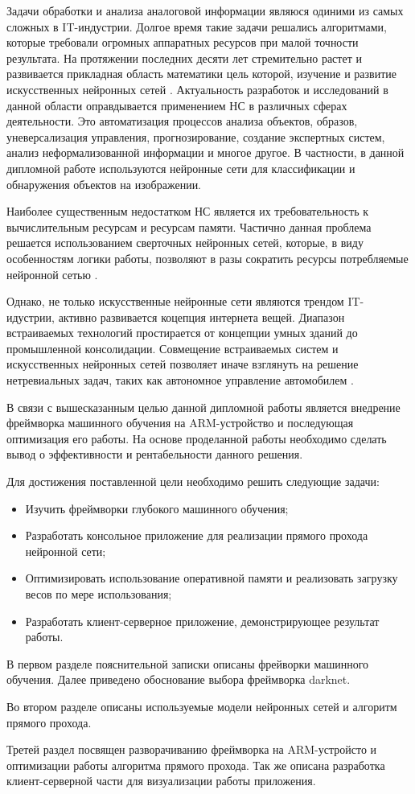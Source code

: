 \documentclass[a4paper,english,russian]{G2-105}
\begin{document}
 \ttl
\par Задачи обработки и анализа аналоговой информации являюся одиними из самых сложных в IT-индустрии. Долгое
время такие задачи решались алгоритмами, которые требовали огромных аппаратных ресурсов при малой точности результата. На протяжении последних десяти лет стремительно растет и развивается прикладная область математики цель которой, изучение и развитие искусственных нейронных сетей \cite{1}. Актуальность разработок и исследований в данной области оправдывается применением НС в различных сферах деятельности. Это автоматизация процессов анализа объектов, образов, уневерсализация управления, прогнозирование, создание экспертных систем, анализ неформализованной информации и многое другое. В частности, в данной дипломной работе используются нейронные сети для классификации и обнаружения объектов на изображении. 
\par Наиболее существенным недостатком НС является их требовательность к вычислительным ресурсам и ресурсам памяти. Частично данная проблема решается использованием сверточных нейронных сетей, которые, в виду особенностям логики работы, позволяют в разы сократить ресурсы потребляемые нейронной сетью \cite{2}.
\par Однако, не только искусственные нейронные сети являются трендом IT-идустрии, активно развивается коцепция интернета вещей. Диапазон встраиваемых технологий простирается от концепции умных зданий до промышленной консолидации. Совмещение встраиваемых систем и искусственных нейронных сетей позволяет иначе взглянуть на решение нетревиальных задач, таких как автономное управление автомобилем \cite{3}.
\par В связи с вышесказанным целью данной дипломной работы является внедрение фреймворка машинного обучения на ARM-устройство и последующая оптимизация его работы. На основе проделанной работы необходимо сделать вывод о эффективности и рентабельности данного решения. 
\par Для достижения поставленной цели необходимо решить следующие задачи:
\begin{itemize}
\item Изучить фреймворки глубокого машинного обучения;
\item Разработать консольное приложение для реализации прямого прохода нейронной сети;
\item Оптимизировать использование оперативной памяти и реализовать загрузку весов по мере использования;
\item Разработать клиент-серверное приложение, демонстрирующее результат работы.
\end{itemize}
\par В первом разделе пояснительной записки описаны фрейворки машинного обучения. Далее приведено обоснование выбора фреймворка darknet.
\par Во втором разделе описаны используемые модели нейронных сетей и алгоритм прямого прохода.
\par Третей раздел посвящен разворачиванию фреймворка на ARM-устройсто и оптимизации работы алгоритма прямого прохода. Так же описана разработка клиент-серверной части для визуализации работы приложения. 
\newpage
\end{document}
